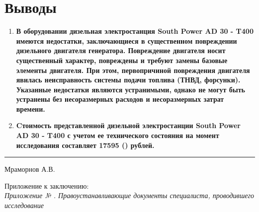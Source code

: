 \section{Выводы}

\begin{enumerate}
	\item \textbf{В оборудовании  дизельная электростанция South Power AD 30 - T400 имеются недостатки, заключающиеся в существенном повреждении дизельного двигателя генератора. Повреждение двигателя носит существенный характер, повреждены и требуют замены базовые элементы двигателя. При этом, первопричиной повреждения двигателя явилась неисправность системы подачи топлива (ТНВД, форсунки).  Указанные недостатки являются устранимыми, однако не могут быть устранены без несоразмерных расходов и несоразмерных затрат времени.}\\[3mm]
	
	\item \textbf{Cтоимость представленной дизельной электростанции South Power AD 30 - T400 с учетом ее технического состояния на момент исследования составляет 17595 () рублей.}
	
	\vspace{5mm}
	
\end{enumerate}

\vspace{10mm}
  \hfill    \rule{45mm}{0.1 mm}   {Мраморнов А.В.}\\
\vspace{7mm}
\relax

\vspace{15mm}

\relax
\noindent Приложение к заключению:\\
\textit{
	Приложение № \Rownum. Правоустанавливающие документы специалиста, проводившего исследование\\
}


